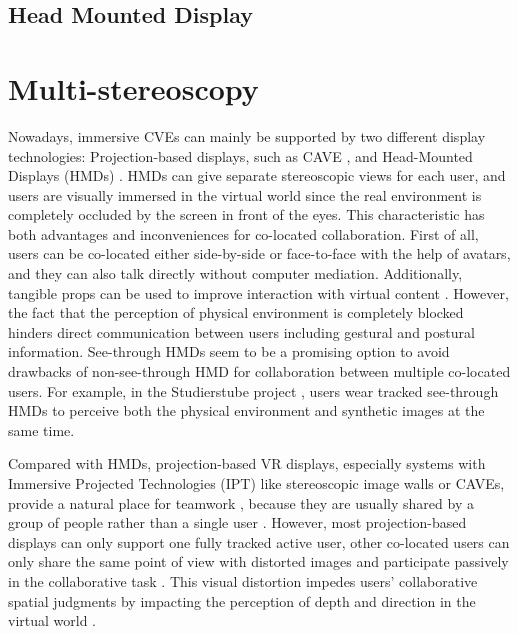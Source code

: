 \subsection{Head Mounted Display}

\section{Multi-stereoscopy}
Nowadays, immersive CVEs can mainly be supported by two different display technologies: Projection-based displays, such as CAVE \citep{CruzNeira1993SPV}, and Head-Mounted Displays (HMDs) \citep{Melzer1997HMD}. HMDs can give separate stereoscopic views for each user, and users are visually immersed in the virtual world since the real environment is completely occluded by the screen in front of the eyes. This characteristic has both advantages and inconveniences for co-located collaboration. First of all, users can be co-located either side-by-side or face-to-face with the help of avatars, and they can also talk directly without computer mediation. Additionally, tangible props can be used to improve interaction with virtual content \citep{Salzmann2008TUS}. However, the fact that the perception of physical environment is completely blocked hinders direct communication between users including gestural and postural information. See-through HMDs seem to be a promising option to avoid drawbacks of non-see-through HMD for collaboration between multiple co-located users. For example, in the Studierstube project \citep{Schmalstieg2002Stube}, users wear tracked see-through HMDs to perceive both the physical environment and synthetic images at the same time.

Compared with HMDs, projection-based VR displays, especially systems with Immersive Projected Technologies (IPT) like stereoscopic image walls or CAVEs, provide a natural place for teamwork \citep{Johanson2002IWP}, because they are usually shared by a group of people rather than a single user \citep{Benford1996SST}. However, most projection-based displays can only support one fully tracked active user, other co-located users can only share the same point of view with distorted images and participate passively in the collaborative task \citep{Bayon2006Multiple}. This visual distortion impedes users' collaborative spatial judgments by impacting the perception of depth and direction in the virtual world \citep{Pollock2012Right}.

